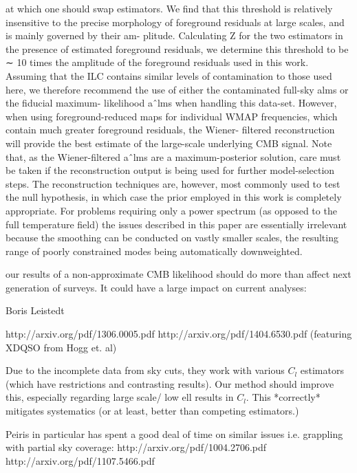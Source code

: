 \documentclass[a4paper, 11pt]{article}
\begin{document}
at which one should swap estimators. We find that this threshold is relatively insensitive to the precise morphology of foreground residuals at large scales, and is mainly governed by their am- plitude. Calculating Z for the two estimators in the presence of estimated foreground residuals, we determine this threshold to be ∼ 10 times the amplitude of the foreground residuals used in this work. Assuming that the ILC contains similar levels of contamination to those used here, we therefore recommend the use of either the contaminated full-sky alms or the fiducial maximum- likelihood aˆlms when handling this data-set. However, when using foreground-reduced maps for individual WMAP frequencies, which contain much greater foreground residuals, the Wiener- filtered reconstruction will provide the best estimate of the large-scale underlying CMB signal. Note that, as the Wiener-filtered aˆlms are a maximum-posterior solution, care must be taken if the reconstruction output is being used for further model-selection steps. The reconstruction techniques are, however, most commonly used to test the null hypothesis, in which case the prior employed in this work is completely appropriate.
For problems requiring only a power spectrum (as opposed to the full temperature field) the issues described in this paper are essentially irrelevant because the smoothing can be conducted on vastly smaller scales, the resulting range of poorly constrained modes being automatically downweighted.

our results of a non-approximate CMB likelihood should do more than affect next generation of surveys. It could have a large impact on current analyses:

Boris Leistedt

http://arxiv.org/pdf/1306.0005.pdf
http://arxiv.org/pdf/1404.6530.pdf  (featuring XDQSO from Hogg et. al)

Due to the incomplete data from sky cuts, they work with various $C_l$ estimators (which have restrictions and contrasting results).
Our method should improve this, especially regarding large scale/ low ell results in $C_l$. This *correctly* mitigates systematics (or at least, better than competing estimators.)

Peiris in particular has spent a good deal of time on similar issues i.e. grappling with partial sky coverage:
http://arxiv.org/pdf/1004.2706.pdf
http://arxiv.org/pdf/1107.5466.pdf

\paragraph{} \hspace{0pt} \\
\end{document}
